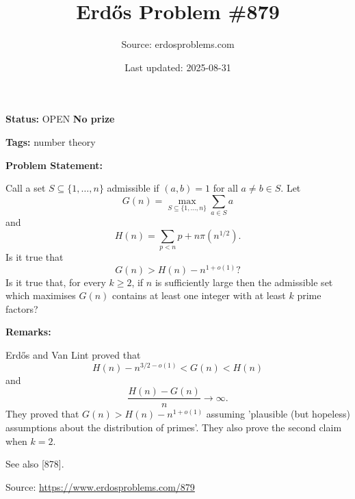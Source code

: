 \documentclass{article}
\title{Erd\H{o}s Problem \#879}
\date{Last updated: 2025-08-31}
\author{Source: erdosproblems.com}
\begin{document}
\maketitle

\noindent\textbf{Status:} OPEN \quad \textbf{No prize}

\noindent\textbf{Tags:} number theory

\medskip
\noindent\textbf{Problem Statement:}

Call a set $S\subseteq \{1,\ldots,n\}$ admissible if $(a,b)=1$ for all $a\neq b\in S$. Let\[G(n) = \max_{S\subseteq \{1,\ldots,n\}} \sum_{a\in S}a\]and\[H(n)=\sum_{p<n}p+ n\pi(n^{1/2}).\]Is it true that\[G(n) >H(n)-n^{1+o(1)}?\]Is it true that, for every $k\geq 2$, if $n$ is sufficiently large then the admissible set which maximises $G(n)$ contains at least one integer with at least $k$ prime factors?

\bigskip
\noindent\textbf{Remarks:}

Erd\H{o}s and Van Lint proved that\[H(n)-n^{3/2-o(1)}<G(n)<H(n)\]and\[\frac{H(n)-G(n)}{n}\to \infty.\]They proved that $G(n)>H(n)-n^{1+o(1)}$ assuming 'plausible (but hopeless) assumptions about the distribution of primes'. They also prove the second claim when $k=2$.

See also [878].

\bigskip
\noindent\small{Source: \url{https://www.erdosproblems.com/879}}
\end{document}
